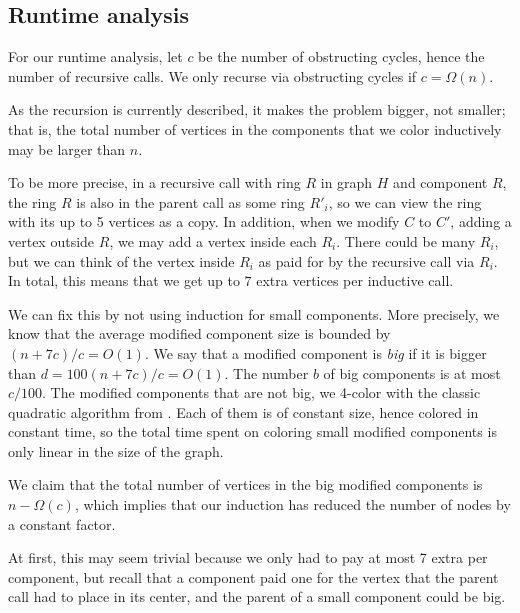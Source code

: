 \documentclass[10pt,a4paper]{article}
\begin{document}
\subsection{Runtime analysis}

For our runtime analysis, let $c$ be the number of obstructing cycles, hence the number of recursive calls. We only recurse via obstructing cycles if $c=\Omega(n)$.

As the recursion is currently described, it makes the problem bigger, not smaller; that is, the total number of vertices in the components that we color inductively may be larger than $n$.

To be more precise, in a recursive call with ring $R$ in graph $H$ and component $R$, the ring $R$ is also in the parent call as some ring $R'_i$, so we can view the ring with its up to 5 vertices as a copy. In addition, when 
we modify $C$ to $C'$, adding a vertex outside $R$, we may add a vertex inside each $R_i$. There could be many $R_i$, but we can think of the vertex inside $R_i$ as paid for by the recursive call via $R_i$. In total, this means that we get up to $7$ extra vertices per inductive call.

We can fix this by not using induction for small components. More precisely, we know that the average modified component size is bounded by $(n+7c)/c=O(1)$. We say that a modified component is \emph{big} if it is bigger
than $d=100(n+7c)/c=O(1)$. The number $b$ of big components is at most $c/100$. The modified components that are not big, we 4-color with the classic 
quadratic algorithm from \cite{RSST-STOC}. Each of them is of constant size, hence colored in constant time, so the total time spent on coloring small modified components 
is only linear in the size of the graph.

We claim that the total number of vertices in the big modified components is $n-\Omega(c)$, which implies that our induction has reduced the number of nodes by a constant factor.


At first, this may seem trivial because we only had to pay at most 7 extra per component, but recall that a component paid one for the vertex that the parent call had to place in its center, and the parent of a small component could be big. 
\end{document}
